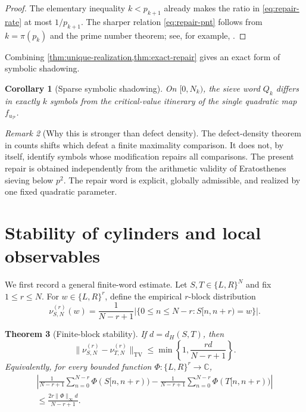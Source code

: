 \documentclass[11pt]{article}
\newtheorem{theorem}{Theorem}[section]
\newtheorem{corollary}[theorem]{Corollary}
\theoremstyle{definition}
\theoremstyle{remark}
\newtheorem{remark}[theorem]{Remark}
\newcommand{\uP}{u_{\mathcal P}}
\newcommand{\TV}{\mathrm{TV}}
\begin{document}
\begin{proof}
The elementary inequality $k<p_{k+1}$ already makes the ratio in \eqref{eq:repair-rate} at most $1/p_{k+1}$.  The sharper relation \eqref{eq:repair-pnt} follows from $k=\pi(p_k)$ and the prime number theorem; see, for example, \citet{MontgomeryVaughan2007}.
\end{proof}

Combining \cref{thm:unique-realization,thm:exact-repair} gives an exact form of symbolic shadowing.

\begin{corollary}[Sparse symbolic shadowing]\label{cor:symbolic-shadowing}
On $[0,N_k)$, the sieve word $Q_k$ differs in exactly $k$ symbols from the critical-value itinerary of the single quadratic map $f_{\uP}$.
\end{corollary}

\begin{remark}[Why this is stronger than defect density]
The defect-density theorem in \citet{WangReformulation2026} counts shifts which defeat a finite maximality comparison.  It does not, by itself, identify symbols whose modification repairs all comparisons.  The present repair is obtained independently from the arithmetic validity of Eratosthenes sieving below $p^2$.  The repair word is explicit, globally admissible, and realized by one fixed quadratic parameter.
\end{remark}

\section{Stability of cylinders and local observables}

We first record a general finite-word estimate.  Let $S,T\in\{L,R\}^N$ and fix $1\le r\le N$.  For $w\in\{L,R\}^r$, define the empirical $r$-block distribution
\begin{equation}\label{eq:block-distribution}
    \nu_{S,N}^{(r)}(w)
    =\frac{1}{N-r+1}
      \bigl|\{0\le n\le N-r:S[n,n+r)=w\}\bigr|.
\end{equation}

\begin{theorem}[Finite-block stability]\label{thm:block-stability}
If $d=d_H(S,T)$, then
\begin{equation}\label{eq:block-tv}
    \bigl\|\nu_{S,N}^{(r)}-\nu_{T,N}^{(r)}\bigr\|_{\TV}
    \le \min\left\{1,\frac{rd}{N-r+1}\right\}.
\end{equation}
Equivalently, for every bounded function $\Phi:\{L,R\}^r\to\mathbb C$,
\begin{equation}\label{eq:local-observable}
\begin{split}
    \left|
    \frac{1}{N-r+1}\sum_{n=0}^{N-r}\Phi(S[n,n+r))
    -\frac{1}{N-r+1}\sum_{n=0}^{N-r}\Phi(T[n,n+r))
    \right|\\
    \le \frac{2r\|\Phi\|_\infty d}{N-r+1}.
\end{split}
\end{equation}
\end{theorem}
\end{document}
